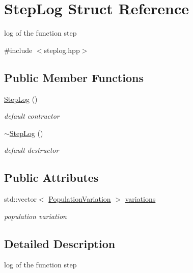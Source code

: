 \hypertarget{structStepLog}{
\section{StepLog Struct Reference}
\label{structStepLog}
}


log of the function step  




{\ttfamily \#include $<$steplog.hpp$>$}

\subsection*{Public Member Functions}
\begin{DoxyCompactItemize}
\item 
\hypertarget{structStepLog_a89511f4eea53f186bcd975b0d1938bd8}{
\hyperlink{structStepLog_a89511f4eea53f186bcd975b0d1938bd8}{StepLog} ()}
\label{structStepLog_a89511f4eea53f186bcd975b0d1938bd8}

\begin{DoxyCompactList}\small\item\em default contructor \end{DoxyCompactList}\item 
\hypertarget{structStepLog_a047a15892af880e4d54cf8a6c0d0c93e}{
\hyperlink{structStepLog_a047a15892af880e4d54cf8a6c0d0c93e}{$\sim$StepLog} ()}
\label{structStepLog_a047a15892af880e4d54cf8a6c0d0c93e}

\begin{DoxyCompactList}\small\item\em default destructor \end{DoxyCompactList}\end{DoxyCompactItemize}
\subsection*{Public Attributes}
\begin{DoxyCompactItemize}
\item 
std::vector$<$ \hyperlink{structPopulationVariation}{PopulationVariation} $>$ \hyperlink{structStepLog_ad0948f21ac2ed795000229a0d40deea7}{variations}
\begin{DoxyCompactList}\small\item\em population variation \end{DoxyCompactList}\end{DoxyCompactItemize}


\subsection{Detailed Description}
log of the function step 

